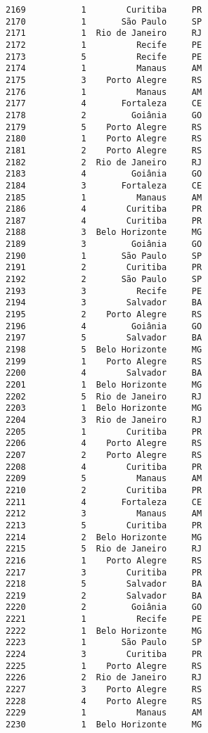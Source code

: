 \documentclass[11pt]{article}
\begin{document}
\begin{Verbatim}[commandchars=\\\{\}]
2169           1        Curitiba     PR  
2170           1       São Paulo     SP  
2171           1  Rio de Janeiro     RJ  
2172           1          Recife     PE  
2173           5          Recife     PE  
2174           1          Manaus     AM  
2175           3    Porto Alegre     RS  
2176           1          Manaus     AM  
2177           4       Fortaleza     CE  
2178           2         Goiânia     GO  
2179           5    Porto Alegre     RS  
2180           1    Porto Alegre     RS  
2181           2    Porto Alegre     RS  
2182           2  Rio de Janeiro     RJ  
2183           4         Goiânia     GO  
2184           3       Fortaleza     CE  
2185           1          Manaus     AM  
2186           4        Curitiba     PR  
2187           4        Curitiba     PR  
2188           3  Belo Horizonte     MG  
2189           3         Goiânia     GO  
2190           1       São Paulo     SP  
2191           2        Curitiba     PR  
2192           2       São Paulo     SP  
2193           3          Recife     PE  
2194           3        Salvador     BA  
2195           2    Porto Alegre     RS  
2196           4         Goiânia     GO  
2197           5        Salvador     BA  
2198           5  Belo Horizonte     MG  
2199           1    Porto Alegre     RS  
2200           4        Salvador     BA  
2201           1  Belo Horizonte     MG  
2202           5  Rio de Janeiro     RJ  
2203           1  Belo Horizonte     MG  
2204           3  Rio de Janeiro     RJ  
2205           1        Curitiba     PR  
2206           4    Porto Alegre     RS  
2207           2    Porto Alegre     RS  
2208           4        Curitiba     PR  
2209           5          Manaus     AM  
2210           2        Curitiba     PR  
2211           4       Fortaleza     CE  
2212           3          Manaus     AM  
2213           5        Curitiba     PR  
2214           2  Belo Horizonte     MG  
2215           5  Rio de Janeiro     RJ  
2216           1    Porto Alegre     RS  
2217           3        Curitiba     PR  
2218           5        Salvador     BA  
2219           2        Salvador     BA  
2220           2         Goiânia     GO  
2221           1          Recife     PE  
2222           1  Belo Horizonte     MG  
2223           1       São Paulo     SP  
2224           3        Curitiba     PR  
2225           1    Porto Alegre     RS  
2226           2  Rio de Janeiro     RJ  
2227           3    Porto Alegre     RS  
2228           4    Porto Alegre     RS  
2229           1          Manaus     AM  
2230           1  Belo Horizonte     MG  

\end{Verbatim}
\end{document}
